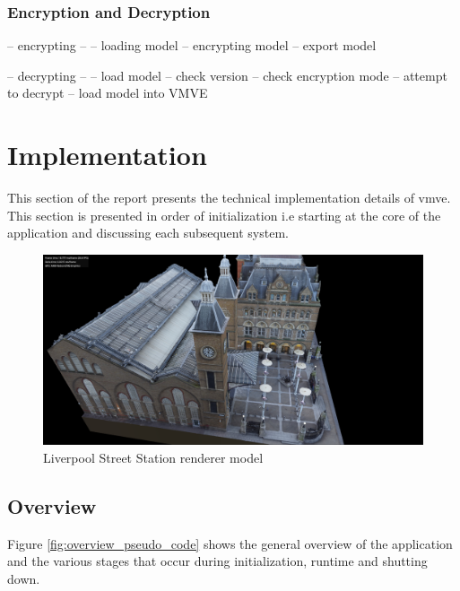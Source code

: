 \documentclass[11pt]{article}
\begin{document}
\subsubsection{Encryption and Decryption}
-- encrypting --
-- loading model
-- encrypting model
-- export model


-- decrypting --
-- load model 
-- check version
-- check encryption mode
-- attempt to decrypt
-- load model into VMVE

\clearpage
\section{Implementation}
This section of the report presents the technical implementation details of
\gls{vmve}. This section is presented in order of initialization i.e starting at
the core of the application and discussing each subsequent system.

\begin{figure}[h!]
  \centering
  \includegraphics[width=\textwidth]{images/rendering.png}
  \caption{Liverpool Street Station renderer model}
  \label{fig:renderer}
\end{figure}


\subsection{Overview}
Figure \ref{fig:overview_pseudo_code} shows the general overview of the application and the various 
stages that occur during initialization, runtime and shutting down.
\end{document}
